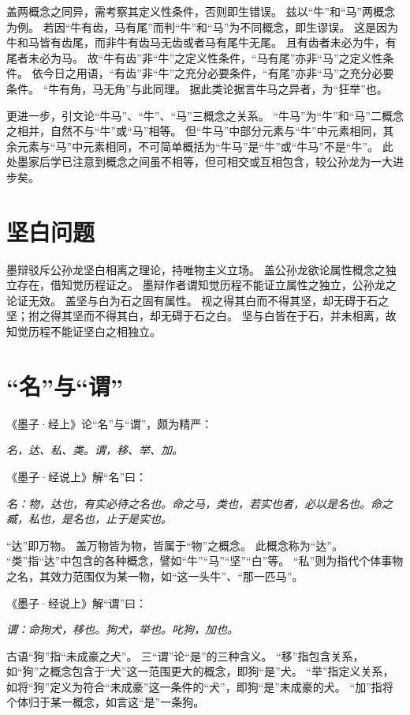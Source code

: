 \documentclass[11pt]{article}
\begin{document}
盖两概念之同异，需考察其定义性条件，否则即生错误。
兹以“牛”和“马”两概念为例。
若因“牛有齿，马有尾”而判“牛”和“马”为不同概念，即生谬误。
这是因为牛和马皆有齿尾，而非牛有齿马无齿或者马有尾牛无尾。
且有齿者未必为牛，有尾者未必为马。
故“牛有齿”非“牛”之定义性条件，“马有尾”亦非“马”之定义性条件。
依今日之用语，“有齿”非“牛”之充分必要条件，“有尾”亦非“马”之充分必要条件。
“牛有角，马无角”与此同理。
据此类论据言牛马之异者，为“狂举”也。

\par

更进一步，引文论“牛马”、“牛”、“马”三概念之关系。
“牛马”为“牛”和“马”二概念之相并，自然不与“牛”或“马”相等。
但“牛马”中部分元素与“牛”中元素相同，其余元素与“马”中元素相同，不可简单概括为“牛马”是“牛”或“牛马”不是“牛”。
此处墨家后学已注意到概念之间虽不相等，但可相交或互相包含，较公孙龙为一大进步矣。

\section{坚白问题}
墨辩驳斥公孙龙坚白相离之理论，持唯物主义立场。
盖公孙龙欲论属性概念之独立存在，借知觉历程证之。
墨辩作者谓知觉历程不能证立属性之独立，公孙龙之论证无效。
盖坚与白为石之固有属性。
视之得其白而不得其坚，却无碍于石之坚；拊之得其坚而不得其白，却无碍于石之白。
坚与白皆在于石，并未相离，故知觉历程不能证坚白之相独立。

\section{“名”与“谓”}
《墨子·经上》论“名”与“谓”，颇为精严：

\textit{名，达、私、类。谓，移、举、加。}

\par

《墨子·经说上》解“名”曰：

\textit{名：物，达也，有实必待之名也。命之马，类也，若实也者，必以是名也。命之臧，私也，是名也，止于是实也。}

“达”即万物。
盖万物皆为物，皆属于“物”之概念。
此概念称为“达”。
“类”指“达”中包含的各种概念，譬如“牛”“马”“坚”“白”等。
“私”则为指代个体事物之名，其效力范围仅为某一物，如“这一头牛”、“那一匹马”。

\par

《墨子·经说上》解“谓”曰：

\textit{谓：命狗犬，移也。狗犬，举也。叱狗，加也。}

古语“狗”指“未成豪之犬”。
三“谓”论“是”的三种含义。
“移”指包含关系，如“狗”之概念包含于“犬”这一范围更大的概念，即狗“是”犬。
“举”指定义关系，如将“狗”定义为符合“未成豪”这一条件的“犬”，即狗“是”未成豪的犬。
“加”指将个体归于某一概念，如言这“是”一条狗。
\end{document}

